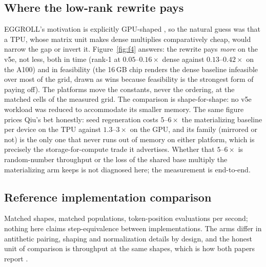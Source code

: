 \subsection{Where the low-rank rewrite pays}
EGGROLL's motivation is explicitly GPU-shaped \citep{eggroll2025}, so the natural guess was that
a TPU, whose matrix unit makes dense multiplies comparatively cheap, would
narrow the gap or invert it. Figure~\ref{fig:f4} answers: the rewrite pays
\emph{more} on the v5e, not less, both in time (rank-1 at
$0.05$--$0.16\times$ dense against $0.13$--$0.42\times$ on the A100) and
in feasibility (the 16\,GB chip renders the dense baseline infeasible over
most of the grid, drawn as wins because feasibility is the strongest form
of paying off). The platforms move the constants, never the ordering, at
the matched cells of the measured grid. The
comparison is shape-for-shape: no v5e workload was reduced to
accommodate its smaller memory. The same figure prices Qiu's bet
\citep{qiu2025} honestly: seed regeneration costs
$5$--$6\times$ the materializing baseline per device on the TPU against
$1.3$--$3\times$ on the GPU, and its family (mirrored or not) is the
only one that never runs out of memory on either platform, which is
precisely the storage-for-compute trade it advertises. Whether that
$5$--$6\times$ is random-number throughput or the loss of the shared base
multiply the materializing arm keeps is not diagnosed here; the
measurement is end-to-end.

\subsection{Reference implementation comparison}

Matched shapes, matched populations, token-position evaluations per
second; nothing here claims
step-equivalence between implementations. The arms differ in antithetic
pairing, shaping and normalization details by design, and the honest unit of
comparison is throughput at the same shapes, which is how both papers report \citep{qiu2025,eggroll2025}.

